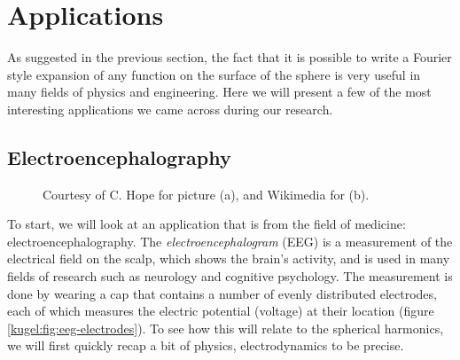 
\section{Applications}
\label{kugel:sec:applications}

As suggested in the previous section, the fact that it is possible to write a
Fourier style expansion of any function on the surface of the sphere is very
useful in many fields of physics and engineering. Here we will present a few of
the most interesting applications we came across during our research.

\subsection{Electroencephalography}

\begin{figure}
  \centering
  \qquad
  \caption{
    Courtesy of C. Hope \cite{sheerman-chase_volunteer_2012} for picture (a),
    and Wikimedia \cite{maschen_english_2013} for (b).
    \label{kugel:fig:eeg}
  }
\end{figure}

To start, we will look at an application that is from the field of medicine:
electroencephalography. The \emph{electroencephalogram} (EEG) is a measurement
of the electrical field on the scalp, which shows the brain's activity, and is
used in many fields of research such as neurology and cognitive psychology.  The
measurement is done by wearing a cap that contains a number of evenly
distributed electrodes, each of which measures the electric potential (voltage)
at their location (figure \ref{kugel:fig:eeg-electrodes}).  To see how this will
relate to the spherical harmonics, we will first quickly recap a bit of physics,
electrodynamics to be precise.

